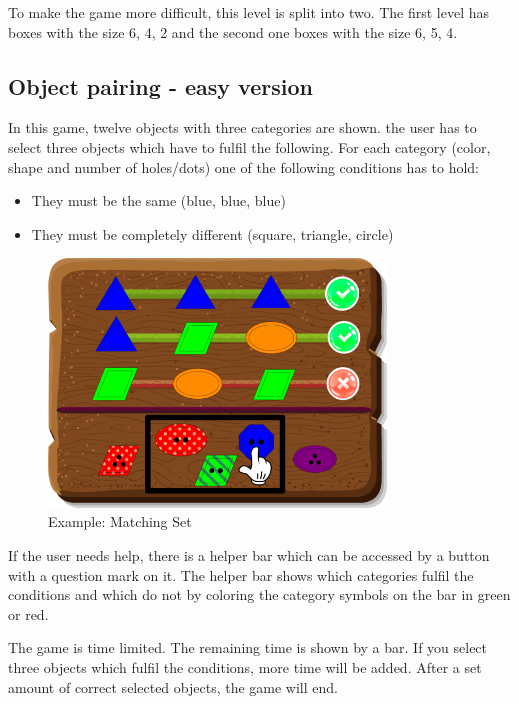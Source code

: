 To make the game more difficult, this level is split into two.
The first level has boxes with the size 6, 4, 2 and the second one boxes with the size 6, 5, 4.

\subsection{Object pairing - easy version}\label{subsec:object-pairing---easy-version}
In this game, twelve objects with three categories are shown.
the user has to select three objects which have to fulfil the following.
For each category (color, shape and number of holes/dots) one of the following conditions has to hold:
\begin{itemize}
    \item They must be the same (blue, blue, blue)
    \item They must be completely different (square, triangle, circle)
\end{itemize}

\begin{figure}[H]
    \centering
    \includegraphics[width=0.8\textwidth]{figures/setexample}
    \caption{Example: Matching Set}
    \label{fig:setexample1}
\end{figure}

If the user needs help, there is a helper bar which can be accessed by a button with a question mark on it.
The helper bar shows which categories fulfil the conditions and which do not
by coloring the category symbols on the bar in green or red.

The game is time limited. The remaining time is shown by a bar.
If you select three objects which fulfil the conditions, more time will be added.
After a set amount of correct selected objects, the game will end.

